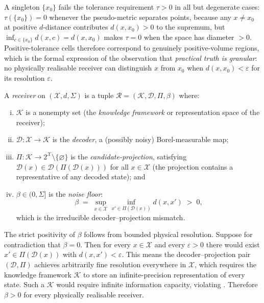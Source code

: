 \begin{remark}
\label{rem:cells-not-points}
A singleton $\{x_0\}$ fails the tolerance requirement $\tau > 0$ in all but
degenerate cases: $\tau(\{x_0\}) = 0$ whenever the pseudo-metric separates
points, because any $x \neq x_0$ at positive $d$-distance contributes
$d(x, x_0) > 0$ to the supremum, but $\inf_{c \in \{x_0\}} d(x, c) = d(x, x_0)$
makes $\tau = 0$ when the space has diameter $> 0$.  Positive-tolerance cells
therefore correspond to genuinely positive-volume regions, which is the formal
expression of the observation that \emph{practical truth is granular}: no
physically realisable receiver can distinguish $x$ from $x_0$ when
$d(x, x_0) < \varepsilon$ for its resolution $\varepsilon$.
\end{remark}

\begin{definition}
\label{def:receiver-full}
\label{def:receiver}
A \emph{receiver} on $(\mathcal{X}, d, \Sigma)$ is a tuple
$\mathcal{R} = (\mathcal{K}, \mathcal{D}, \Pi, \beta)$ where:
\begin{enumerate}[(i)]
  \item $\mathcal{K}$ is a nonempty set (the \emph{knowledge framework} or
    representation space of the receiver);
  \item $\mathcal{D} : \mathcal{X} \to \mathcal{K}$ is the \emph{decoder},
    a (possibly noisy) Borel-measurable map;
  \item $\Pi : \mathcal{K} \to 2^{\mathcal{X}} \setminus \{\varnothing\}$ is
    the \emph{candidate-projection}, satisfying
    $\mathcal{D}(x) \in \mathcal{D}(\Pi(\mathcal{D}(x)))$ for all $x \in \mathcal{X}$
    (the projection contains a representative of any decoded state); and
  \item $\beta \in (0, \Sigma]$ is the \emph{noise floor}:
    \[
      \beta \;=\; \sup_{x \in \mathcal{X}} \inf_{x' \in \Pi(\mathcal{D}(x))}
      d(x, x') \;>\; 0 ,
    \]
    which is the irreducible decoder--projection mismatch.
\end{enumerate}
\end{definition}

\begin{remark}
\label{rem:beta-positive}
The strict positivity of $\beta$ follows from bounded physical resolution.
Suppose for contradiction that $\beta = 0$.  Then for every $x \in \mathcal{X}$
and every $\varepsilon > 0$ there would exist $x' \in \Pi(\mathcal{D}(x))$
with $d(x, x') < \varepsilon$.  This means the decoder--projection pair
$(\mathcal{D}, \Pi)$ achieves arbitrarily fine resolution everywhere in
$\mathcal{X}$, which requires the knowledge framework $\mathcal{K}$ to store
an infinite-precision representation of every state.  Such a $\mathcal{K}$
would require infinite information capacity, violating
.  Therefore $\beta > 0$ for every physically
realisable receiver.
\end{remark}

